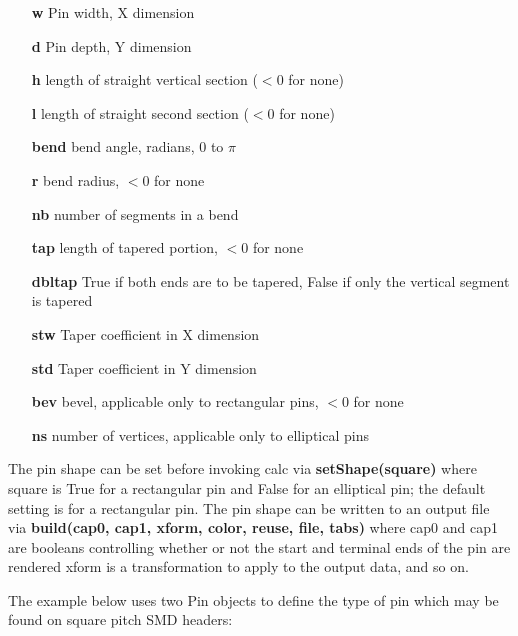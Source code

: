 \documentclass[a4paper, dvipdfm]{article}
\begin{document}
\begin{itemize}
\item[\textbf{w}] Pin width, X dimension\\
\item[\textbf{d}] Pin depth, Y dimension\\
\item[\textbf{h}] length of straight vertical section ($<0$ for none)\\
\item[\textbf{l}] length of straight second section ($<0$ for none)\\
\item[\textbf{bend}] bend angle, radians, $0$ to $\pi$\\
\item[\textbf{r}] bend radius, $<0$ for none\\
\item[\textbf{nb}] number of segments in a bend\\
\item[\textbf{tap}] length of tapered portion, $<0$ for none\\
\item[\textbf{dbltap}] True if both ends are to be tapered, False if only the vertical segment is tapered\\
\item[\textbf{stw}] Taper coefficient in X dimension\\
\item[\textbf{std}] Taper coefficient in Y dimension\\
\item[\textbf{bev}] bevel, applicable only to rectangular pins, $<0$ for none\\
\item[\textbf{ns}] number of vertices, applicable only to elliptical pins\\
\end{itemize}

The pin shape can be set before invoking calc via \textbf{setShape(square)} where square
is True for a rectangular pin and False for an elliptical pin; the default setting is for a
rectangular pin. The pin shape can be written to an output file via
\textbf{build(cap0, cap1, xform, color, reuse, file, tabs)} where cap0 and cap1
are booleans controlling whether or not the start and terminal ends of the pin are rendered
xform is a transformation to apply to the output data, and so on.

The example below uses two Pin objects to define the type of pin which may be found on
square pitch SMD headers:
\end{document}
